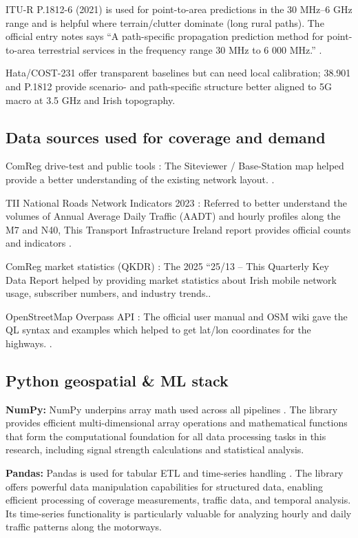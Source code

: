 \documentclass[MScCS]{uccthesis}
\begin{document}
ITU-R P.1812-6 (2021) is used for point-to-area predictions in the 30 MHz--6 GHz range and is helpful where terrain/clutter dominate (long rural paths). The official entry notes says ``A path-specific propagation prediction method for point-to-area terrestrial services in the frequency range 30 MHz to 6 000 MHz.'' \cite{itu_p1812_6}.

 Hata/COST-231 offer transparent baselines but can need local calibration; 38.901 and P.1812 provide scenario- and path-specific structure better aligned to 5G macro at 3.5 GHz and Irish topography.

\subsection{Data sources used for coverage and demand}

ComReg drive-test and public tools : The Siteviewer / Base-Station map helped provide a better understanding of the existing network layout. \cite{comreg_base_stations, comreg2022coveragemap}.

TII National Roads Network Indicators 2023 : Referred to better understand the volumes of Annual Average Daily Traffic (AADT) and hourly profiles along the M7 and N40, This Transport Infrastructure Ireland report provides official counts and indicators \cite{tii2024indicators}.

ComReg market statistics (QKDR) : The 2025 ``25/13 -- This Quarterly Key Data Report helped by providing market statistics about Irish mobile network usage, subscriber numbers, and industry trends.\cite{comreg25_13}.

OpenStreetMap Overpass API : The official user manual and OSM wiki gave the QL syntax and examples which helped to get lat/lon coordinates for the highways. \cite{osm_overpass}.

\subsection{Python geospatial \& ML stack}

\textbf{NumPy:} NumPy underpins array math used across all pipelines \cite{harris2020array}. The library provides efficient multi-dimensional array operations and mathematical functions that form the computational foundation for all data processing tasks in this research, including signal strength calculations and statistical analysis.

\textbf{Pandas:} Pandas is used for tabular ETL and time-series handling \cite{mckinney2017python}. The library offers powerful data manipulation capabilities for structured data, enabling efficient processing of coverage measurements, traffic data, and temporal analysis. Its time-series functionality is particularly valuable for analyzing hourly and daily traffic patterns along the motorways.
\end{document}
